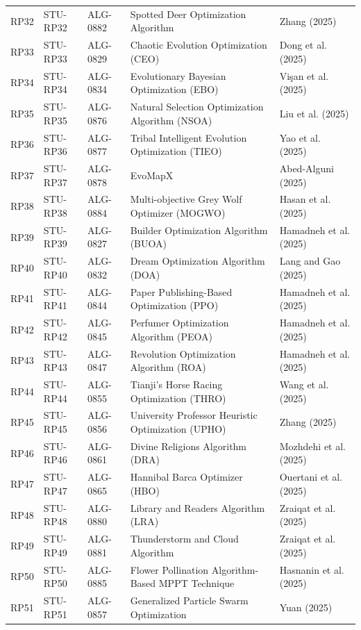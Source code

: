 \documentclass[9pt]{article}
\begin{document}
\begin{landscape}
\begin{longtable}{P{1.1cm}P{1.8cm}P{1.8cm}P{9.5cm}P{6.0cm}}
RP32 & STU-RP32 & ALG-0882 & Spotted Deer Optimization Algorithm & Zhang (2025) \\
RP33 & STU-RP33 & ALG-0829 & Chaotic Evolution Optimization (CEO) & Dong et al. (2025) \\
RP34 & STU-RP34 & ALG-0834 & Evolutionary Bayesian Optimization (EBO) & Vişan et al. (2025) \\
RP35 & STU-RP35 & ALG-0876 & Natural Selection Optimization Algorithm (NSOA) & Liu et al. (2025) \\
RP36 & STU-RP36 & ALG-0877 & Tribal Intelligent Evolution Optimization (TIEO) & Yao et al. (2025) \\
RP37 & STU-RP37 & ALG-0878 & EvoMapX & Abed-Alguni (2025) \\
RP38 & STU-RP38 & ALG-0884 & Multi-objective Grey Wolf Optimizer (MOGWO) & Hasan et al. (2025) \\
RP39 & STU-RP39 & ALG-0827 & Builder Optimization Algorithm (BUOA) & Hamadneh et al. (2025) \\
RP40 & STU-RP40 & ALG-0832 & Dream Optimization Algorithm (DOA) & Lang and Gao (2025) \\
RP41 & STU-RP41 & ALG-0844 & Paper Publishing-Based Optimization (PPO) & Hamadneh et al. (2025) \\
RP42 & STU-RP42 & ALG-0845 & Perfumer Optimization Algorithm (PEOA) & Hamadneh et al. (2025) \\
RP43 & STU-RP43 & ALG-0847 & Revolution Optimization Algorithm (ROA) & Hamadneh et al. (2025) \\
RP44 & STU-RP44 & ALG-0855 & Tianji's Horse Racing Optimization (THRO) & Wang et al. (2025) \\
RP45 & STU-RP45 & ALG-0856 & University Professor Heuristic Optimization (UPHO) & Zhang (2025) \\
RP46 & STU-RP46 & ALG-0861 & Divine Religions Algorithm (DRA) & Mozhdehi et al. (2025) \\
RP47 & STU-RP47 & ALG-0865 & Hannibal Barca Optimizer (HBO) & Ouertani et al. (2025) \\
RP48 & STU-RP48 & ALG-0880 & Library and Readers Algorithm (LRA) & Zraiqat et al. (2025) \\
RP49 & STU-RP49 & ALG-0881 & Thunderstorm and Cloud Algorithm & Zraiqat et al. (2025) \\
RP50 & STU-RP50 & ALG-0885 & Flower Pollination Algorithm-Based MPPT Technique & Hasnanin et al. (2025) \\
RP51 & STU-RP51 & ALG-0857 & Generalized Particle Swarm Optimization & Yuan (2025) \\

\end{longtable}
\end{landscape}
\end{document}
